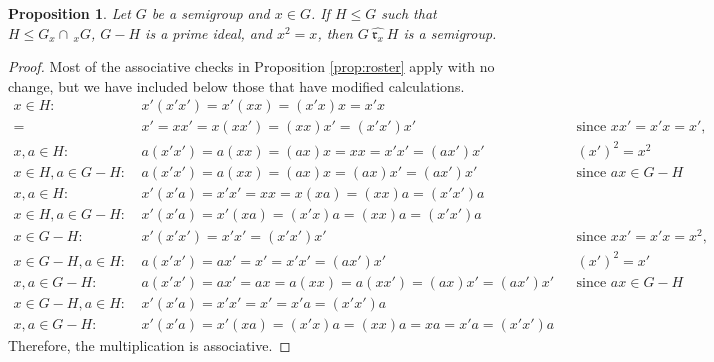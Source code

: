 \documentclass{article}
\theoremstyle{plain}
\newtheorem{Prop}[Thm]{Proposition}
\theoremstyle{definition}
\newcommand{\propref}[1]{Proposition \ref{#1}}
\newcommand{\rhat}[1]{\ \widehat{\mathfrak{r}_{#1}}\ }
\begin{document}
\begin{Prop} Let $G$ be a semigroup and $x\in G$. If $H\le G$ such that $H\le G_x\cap\,_xG$, $G-H$ is a prime ideal, and $x^2=x$, then $G\rhat xH$ is a semigroup.
\end{Prop}
\begin{proof}
Most of the associative checks in \propref{prop:roster} apply with no change, but we have included below those that have modified calculations.
 \begin{align*}
    x\in H:\ & x'(x'x') = x'(xx) = (x'x)x = x'x\\ =\ &x' =xx' =x(xx') = (xx)x' =(x'x')x'&&\text{since } xx'=x'x=x',\\
    x, a\in H:\ &a(x'x') = a(xx) = (ax)x = xx = x'x' = (ax')x' && (x')^2=x^2 \\
    x\in H, a\in G-H:\ &a(x'x') = a(xx) = (ax)x = (ax)x' = (ax')x'&&\text{since } ax\in G-H\\
    x, a\in H:\ &x'(x'a) = x'x' = xx = x(xa) = (xx)a = (x'x')a && \\
    x\in H, a\in G-H:\ &x'(x'a) = x'(xa) = (x'x)a = (xx)a = (x'x')a&&\\    
    x\in G-H:\ & x'(x'x') = x'x' = (x'x')x'&&\text{since } xx'=x'x=x^2,\\
    x\in G-H, a\in H:\ &a(x'x') = ax' = x' = x'x' = (ax')x' && (x')^2=x' \\
    x,a \in G-H:\ &a(x'x') = ax' =ax = a(xx) = a(xx') = (ax)x' = (ax')x'&&\text{since } ax\in G-H\\
    x\in G-H, a\in H:\ &x'(x'a) = x'x' = x' = x'a = (x'x')a && \\
    x,a\in G-H:\ &x'(x'a) = x'(xa) = (x'x)a = (xx)a = xa= x'a= (x'x')a&&
\end{align*}
Therefore, the multiplication is associative.
\end{proof}
\end{document}
